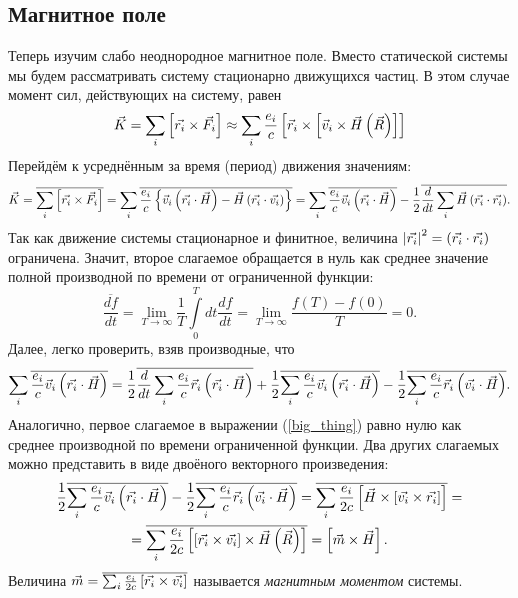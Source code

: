 \subsection{Магнитное поле}
    Теперь изучим слабо неоднородное магнитное поле. Вместо статической системы мы будем рассматривать систему стационарно движущихся частиц.
    В этом случае момент сил, действующих на систему, равен
    \[
        \vec{K} = \sum_i\left[{\vec{r_i}\times\vec{F_i}}\right] \approx \sum_i \frac{e_i}{c} \left[{\vec{r}_i \times  \left[{\vec{v}_i \times \vec{H}\left({\vec{R}}\right)}\right]}\right]
    \]
    Перейдём к усреднённым за время (период) движения значениям:
    \begin{gather*}
        \vec{K} = \overline{\sum_i\left[{\vec{r_i}\times\vec{F_i}}\right]} = \sum_i \overline{\frac{e_i}{c} \left\{{\vec{v}_i \left({\vec{r_i}\cdot\vec{H}}\right) - \vec{H} \left({\vec{r_i}\cdot\vec{v_i}}\right)}\right\}} = 
        \sum_i \overline{\frac{e_i}{c} \vec{v}_i \left({\vec{r_i}\cdot\vec{H}}\right)} -\frac 12 \overline{\frac{d}{dt} \sum_i \vec{H}\left({\vec{r_i}\cdot\vec{r_i}}\right)}.
    \end{gather*}
    Так как движение системы стационарное и финитное, величина $\left|{\vec{r_i}}\right|^2 = \left({\vec{r_i}\cdot\vec{r_i}}\right)$ ограничена. Значит, второе слагаемое обращается в нуль как
    среднее значение полной производной по времени от ограниченной функции:
    \[
        \overline{\frac{df}{dt}} = \lim_{T \rightarrow \infty} \frac 1T \int\limits_0^T dt \frac{df}{dt} = \lim_{T \rightarrow \infty} \frac{f(T) - f(0)}{T} = 0.
    \]
    Далее, легко проверить, взяв производные, что
    \begin{equation}
        \sum_i \overline{\frac{e_i}{c} \vec{v}_i \left({\vec{r_i}\cdot\vec{H}}\right)} = \frac 12 \overline{\frac{d}{dt}\sum_i \frac{e_i}{c}\vec{r}_i\left({\vec{r_i}\cdot\vec{H}}\right)}
        + \frac 12 \overline{\sum_i\frac{e_i}{c}\vec{v}_i \left({\vec{r_i}\cdot\vec{H}}\right)} - \frac 12 \overline{\sum_i \frac{e_i}{c} \vec{r}_i \left({\vec{v_i}\cdot\vec{H}}\right)}. \label{big_thing}
    \end{equation}
    Аналогично, первое слагаемое в выражении (\ref{big_thing}) равно нулю как среднее производной по времени ограниченной функции. Два других слагаемых
    можно представить в виде двоёного векторного произведения:
    \begin{gather*}
        \frac 12 \overline{\sum_i\frac{e_i}{c}\vec{v}_i \left({\vec{r_i}\cdot\vec{H}}\right)} - \frac 12 \overline{\sum_i \frac{e_i}{c} \vec{r}_i \left({\vec{v_i}\cdot\vec{H}}\right)} =
        \overline{\sum_i\frac{e_i}{2c} \left[{\vec{H} \times \left[{\vec{v_i}\times\vec{r_i}}\right]}\right]} = \\
        = \overline{\sum_i \frac{e_i}{2c}\left[{\left[{\vec{r_i}\times\vec{v_i}}\right] \times \vec{H}\left({\vec{R}}\right)}\right]} =
        \left[{\vec{m}\times\vec{H}}\right].
    \end{gather*}
    Величина $\vec{m} = \overline{\sum_i \frac{e_i}{2c}\left[{\vec{r_i}\times\vec{v_i}}\right]}$ называется \textit{магнитным моментом} системы.

